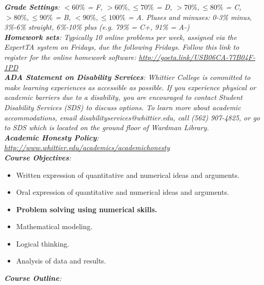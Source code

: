 \documentclass[10pt]{article}
\begin{document}
\textit{\textbf{Grade Settings}: $<60\%$ = F, $>60\%,\leq 70\%$ = D, $>70\%,\leq80\%$ = C, $>80\%,\leq 90\%$ = B, $<90\%,\leq 100\%$ = A.  Pluses and minuses: 0-3\% minus, 3\%-6\% straight, 6\%-10\% plus (e.g. 79\% = C+, 91\% = A-)} \\
\textit{\textbf{Homework sets}: Typically 10 online problems per week, assigned via the ExpertTA system on Fridays, due the following Fridays.  Follow this link to register for the online homework software: \url{http://goeta.link/USB06CA-77B04F-1PD}} \\
\textit{\textbf{ADA Statement on Disability Services}: Whittier College is committed to make learning experiences as accessible as possible. If you experience physical or academic barriers due to a disability, you are encouraged to contact Student Disability Services (SDS) to discuss options. To learn more about academic accommodations, email disabilityservices@whittier.edu, call (562) 907-4825, or go to SDS which is located on the ground floor of Wardman Library.} \\
\textit{\textbf{Academic Honesty Policy}: \url{http://www.whittier.edu/academics/academichonesty}} \\
\textit{\textbf{Course Objectives}:}
\begin{itemize}
\item Written expression of quantitative and numerical ideas and arguments.
\item Oral expression of quantitative and numerical ideas and arguments.
\item \textbf{Problem solving using numerical skills.}
\item Mathematical modeling.
\item Logical thinking.
\item Analysis of data and results.
\end{itemize}
\textit{\textbf{Course Outline}:}
\end{document}
